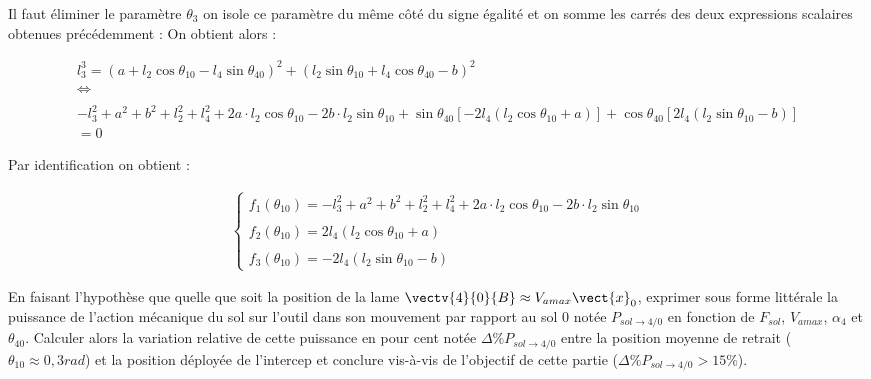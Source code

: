 \documentclass[11pt]{article}
\begin{document}
\begin{UPSTIcorrige}

Il faut éliminer le paramètre $\theta_3$ on isole ce paramètre du même côté du signe égalité et on somme les carrés des deux expressions scalaires obtenues précédemment : 
 On obtient alors : 
 
\begin{align*}
l_3^3=\left(a+l_2\cos\theta_{10}-l_4\sin\theta_{40}\right)^2+\left(l_2\sin\theta_{10}+l_4\cos\theta_{40}-b\right)^2
\\
\Leftrightarrow\\
\\
-l_3^2+a^2+b^2+l_2^2+l_4^2+2a\cdot l_2\cos\theta_{10}-2b\cdot l_2\sin\theta_{10}+\sin\theta_{40}\left[-2l_4\left(l_2\cos\theta_{10}+a\right)\right]
+\cos\theta_{40}\left[2l_4\left(l_2\sin\theta_{10}-b\right)\right]\\
=0
\end{align*}

Par identification on obtient : 

\begin{align*}
\left\{
\begin{array}{l}
f_1(\theta_{10})=-l_3^2+a^2+b^2+l_2^2+l_4^2+2a\cdot l_2\cos\theta_{10}-2b\cdot l_2\sin\theta_{10}\\
\\
f_2(\theta_{10})=2l_4\left(l_2\cos\theta_{10}+a\right)\\
\\
f_3(\theta_{10})=-2l_4\left(l_2\sin\theta_{10}-b\right)
\end{array}
\right.
\end{align*}



\end{UPSTIcorrige}

\UPSTIquestion En faisant l'hypothèse que quelle que soit la position de la lame $\vectv{4}{0}{B}\approx V_{a max}\vect{x}_0$, exprimer sous
forme littérale la puissance de l'action mécanique du sol sur l'outil dans son mouvement par rapport au sol 0
notée $P_{sol\to 4/0}$ en fonction de $F_{sol}$, $V_{a max}$, $\alpha_4$ et $\theta_{40}$. Calculer alors la variation relative de cette puissance en pour cent notée $\Delta \% P_{sol\to 4/0}$ entre la position moyenne de retrait ($\theta_{10} \approx 0,3 rad$) et la position déployée de
l'intercep et conclure vis-à-vis de l'objectif de cette partie ($\Delta \% P_{sol\to 4/0}> 15 \%$).
\end{document}
